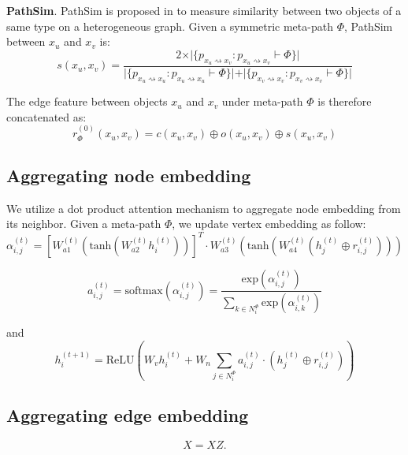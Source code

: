 \noindent{\small$\bullet$}\textbf{PathSim}. 
PathSim is proposed in \citep{SunHYYW11} to measure similarity between two objects of a same type on a heterogeneous graph. Given a symmetric meta-path $\Phi$, PathSim between $x_u$ and $x_v$ is:
\begin{equation*}
s(x_u,x_v) = \frac{2\times\vert\{ p_{x_u \rightsquigarrow x_v}:p_{x_u \rightsquigarrow x_v} \vdash \Phi \}\vert}{\vert\{ p_{x_u \rightsquigarrow x_u}:p_{x_u \rightsquigarrow x_u} \vdash \Phi \}\vert +\vert\{ p_{x_v \rightsquigarrow x_v}:p_{x_v \rightsquigarrow x_v} \vdash \Phi \}\vert }
\end{equation*}

The edge feature between objects $x_u$ and $x_v$ under meta-path $\Phi$ is therefore concatenated as:
\begin{equation}
\label{eq:edge}
r^{(0)}_\Phi(x_u,x_v) = c(x_u,x_v)\oplus o(x_u,x_v)\oplus s(x_u,x_v)
\end{equation}

\subsection{Aggregating node embedding}

We utilize a dot product attention mechanism to aggregate node embedding from its neighbor. Given a meta-path $\Phi$, we update vertex embedding as follow:
\begin{equation}
\label{eq:dot}
\alpha^{(t)}_{i,j} = [W_{a1}^{(t)}(\text{tanh}(W_{a2}^{(t)}h^{(t)}_i ))]^T \cdot W_{a3}^{(t)}(\text{tanh}(W_{a4}^{(t)}(h^{(t)}_j \oplus r^{(t)}_{i,j}) ))
\end{equation}

\begin{equation}
\label{eq:softmax}
a^{(t)}_{i,j} = \text{softmax}(\alpha^{(t)}_{i,j}) = \dfrac{\text{exp}(\alpha^{(t)}_{i,j})}{\sum_{k\in N^\Phi_i}\text{exp}(\alpha^{(t)}_{i,k})}
\end{equation}

and 
\begin{equation}
\label{eq:upd_node}
h^{(t+1)}_i = \text{ReLU}( W_{v} h^{(t)}_i + W_{n} \sum_{j\in N^\Phi_i} a^{(t)}_{i,j} \cdot ( h^{(t)}_j \oplus r^{(t)}_{i,j} ) )
\end{equation} 

\subsection{Aggregating edge embedding}
\begin{equation}
\label{eq:upd_edge}
X = XZ.
\end{equation} 


